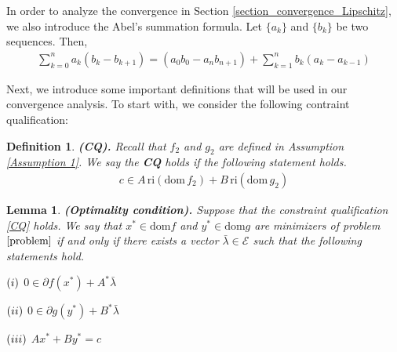 \documentclass{article}
\numberwithin{equation}{section}
\newtheorem{lemma}{Lemma}[section]
\newtheorem{definition}{Definition}[section]
\begin{document}
In order to analyze the convergence in Section \ref{section_convergence_Lipschitz}, we also introduce the Abel's summation formula. Let
$\{a_k\}$ and $\{b_k\}$ be two sequences. Then, 
\begin{align}
    \sum\limits_{k=0}^n a_k(b_k - b_{k+1}) = (a_0b_0 - a_{n}b_{n+1})+ \sum\limits_{k=1}^{n} b_{k}(a_{k}-a_{k-1})
    \label{Abel formula}
\end{align}

Next, we introduce some important definitions that will be used in our convergence analysis. To start with, 
we consider the following contraint qualification: 
\begin{definition}
    {\rm{\textbf{(CQ).}}} Recall that $f_2$ and $g_2$ are defined in Assumption \ref{Assumption 1}. 
    We say the \textbf{CQ} holds if the following statement holds. 
    \begin{align}
        c \in A\hspace{2pt} \mathrm{ri}\left(\mathrm{dom}\hspace{2pt}f_2\right) +
    B\hspace{2pt} \mathrm{ri}\left(\mathrm{dom}\hspace{2pt}g_2\right) \label{CQ} 
    \end{align}
\end{definition}
\begin{lemma}
    {\rm{\textbf{(Optimality condition).}}} \label{optimal}
    Suppose that the constraint qualification \eqref{CQ} holds. 
    We say that $x^*\in \mathrm{dom}f$ and $y^*\in \mathrm{dom}g$ are minimizers of problem $\eqref{problem}$ 
    if and only if there exists a vector $\bar{\lambda} \in \mathcal{E}$ such that the following statements hold.
    
    $(\romannumeral1)$ $0 \in \partial f(x^*) + A^*\bar{\lambda}  $

    $(\romannumeral2)$ $0 \in \partial g(y^*) + B^*\bar{\lambda} $

    $(\romannumeral3)$ $Ax^* + By^* =c$
    
\end{lemma}
\end{document}
